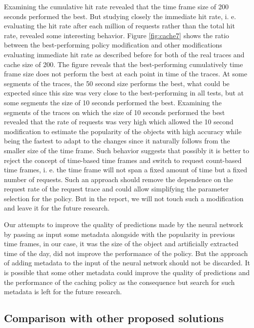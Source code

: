 Examining the cumulative hit rate revealed that the time frame size of 200 seconds performed the best. But studying closely the immediate hit rate, i. e. evaluating the hit rate after each million of requests rather than the total hit rate, revealed some interesting behavior. Figure \ref{fig:cache7} shows the ratio between the best-performing policy modification and other modifications evaluating immediate hit rate as described before for both of the real traces and cache size of 200. The figure reveals that the best-performing cumulatively time frame size does not perform the best at each point in time of the traces. At some segments of the traces, the 50 second size performs the best, what could be expected since this size was very close to the best-performing in all tests, but at some segments the size of 10 seconds performed the best. Examining the segments of the traces on which the size of 10 seconds performed the best revealed that the rate of requests was very high which allowed the 10 second modification to estimate the popularity of the objects with high accuracy while being the fastest to adapt to the changes since it naturally follows from the smaller size of the time frame. Such behavior suggests that possibly it is better to reject the concept of time-based time frames and switch to request count-based time frames, i. e. the time frame will not span a fixed amount of time but a fixed number of requests. Such an approach should remove the dependence on the request rate of the request trace and could allow simplifying the parameter selection for the policy. But in the report, we will not touch such a modification and leave it for the future research.

Our attempts to improve the quality of predictions made by the neural network by passing as input some metadata alongside with the popularity in previous time frames, in our case, it was the size of the object and artificially extracted time of the day, did not improve the performance of the policy. But the approach of adding metadata to the input of the neural network should not be discarded. It is possible that some other metadata could improve the quality of predictions and the performance of the caching policy as the consequence but search for such metadata is left for the future research.

\subsection{Comparison with other proposed solutions} \label{comparison}

